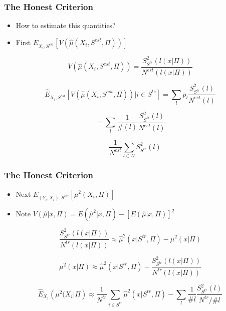 \documentclass[
  shownotes,
  xcolor={svgnames},
  hyperref={colorlinks,citecolor=DarkBlue,linkcolor=DarkRed,urlcolor=DarkBlue}
  , aspectratio=169]{beamer}
\begin{document}
\begin{frame}[fragile]
\frametitle{The Honest Criterion}

\begin{itemize}
 \item How to estimate this quantities?
 \item First $E_{X_{i},S^{est}}\left[V(\hat{\mu}(X_{i},S^{est},\Pi))\right]$
\end{itemize}

\[
V(\hat{\mu}(X_{i},S^{est},\Pi))=\frac{S_{S^{tr}}^{2}\left(l\left(x|\Pi\right)\right)}{N^{est}\left(l\left(x|\Pi\right)\right)}
\]

\[
\hat{E}_{X_{i},S^{est}}\left[V(\hat{\mu}(X_{i},S^{est},\Pi))|i\in S^{te}\right]=\sum_{l}p_{l}\frac{S_{S^{tr}}^{2}\left(l\right)}{N^{est}\left(l\right)}
\]

\[
=\sum_{l}\frac{1}{\#(l)}\frac{S_{S^{tr}}^{2}\left(l\right)}{N^{est}\left(l\right)}
\]

\[
=\frac{1}{N^{est}}\sum_{l\in\Pi}S_{S^{tr}}^{2}\left(l\right)
\]

\end{frame}
\begin{frame}[fragile]
\frametitle{The Honest Criterion}


\begin{itemize}
  \item Next $E_{(Y_{i},X_{i}),S^{est}}\left[\mu^{2}(X_{i},\Pi)\right]$
  \item Note $V(\hat{\mu}|x,\Pi)=E(\hat{\mu}^{2}|x,\Pi)-\left[E(\hat{\mu}|x,\Pi)\right]^{2}$
\end{itemize}




\[
\frac{S_{S^{tr}}^{2}\left(l\left(x|\Pi\right)\right)}{N^{tr}\left(l\left(x|\Pi\right)\right)}\approx\hat{\mu}^{2}(x|S^{tr},\Pi)-\mu^{2}(x|\Pi)
\]

\[
\mu^{2}(x|\Pi)\approx\hat{\mu}^{2}(x|S^{tr},\Pi)-\frac{S_{S^{tr}}^{2}\left(l\left(x|\Pi\right)\right)}{N^{tr}\left(l\left(x|\Pi\right)\right)}
\]

\[
\hat{E}_{X_{i}}\left(\mu^{2}(X_{i}|\Pi\right)\approx\frac{1}{N^{tr}}\sum_{i\in S^{tr}}\hat{\mu}^{2}(x|S^{tr},\Pi)-\sum_{l}\frac{1}{\#l}\frac{S_{S^{tr}}^{2}\left(l\right)}{N^{tr}/\#l}
\]

\end{frame}
\end{document}
